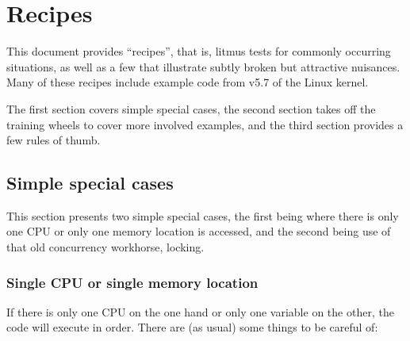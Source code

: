 \section{Recipes}

This document provides ``recipes'', that is, litmus tests for commonly
occurring situations, as well as a few that illustrate subtly broken but
attractive nuisances.
Many of these recipes include example code from v5.7 of the Linux kernel.

The first section covers simple special cases, the second section
takes off the training wheels to cover more involved examples,
and the third section provides a few rules of thumb.


\subsection{Simple special cases}

This section presents two simple special cases, the first being where
there is only one CPU or only one memory location is accessed, and the
second being use of that old concurrency workhorse, locking.


\subsubsection{Single CPU or single memory location}

If there is only one CPU on the one hand or only one variable
on the other, the code will execute in order.
There are (as usual) some things to be careful of:

